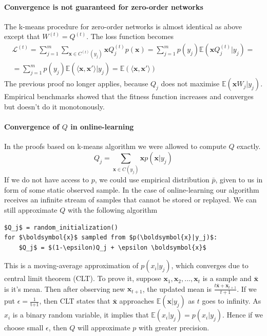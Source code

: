 \documentclass[12pt]{article}
\begin{document}
\paragraph{Convergence is not guaranteed for zero-order networks}
The k-means procedure for zero-order networks is almost identical as above except that $W^{(t)}=Q^{(t)}$. The loss function becomes
\begin{gather*}
\mathcal{L}^{(t)} = \sum_{j=1}^m \sum_{\boldsymbol{x}\in C^{(t)}(y_j)} \boldsymbol{x} Q_j^{(t)} p(\boldsymbol{x}) = \sum_{j=1}^m p(y_j) \mathbb{E}(\boldsymbol{x} Q_j^{(t)}|y_j) = \\ 
= \sum_{j=1}^m p(y_j) \mathbb{E}(\langle \boldsymbol{x},\boldsymbol{x}' \rangle |y_j) 	 = \mathbb{E}(\langle \boldsymbol{x},\boldsymbol{x}' \rangle)
\end{gather*}
The previous proof no longer applies, because $Q_j$ does not maximise $\mathbb{E}(\boldsymbol{x}W_j|y_j)$. Empirical benchmarks showed that the fitness function increases and converges but doesn't do it monotonously. 
\paragraph{Convergence of $Q$ in online-learning}
In the proofs based on k-means algorithm we were allowed to compute $Q$ exactly. 
\[
Q_j = \sum_{\boldsymbol{x}\in C(y_j)}\boldsymbol{x}p(\boldsymbol{x}|y_j)
\]
If we do not have access to $p$, we could use empirical distribution $\bar{p}$, given to us in form of some static observed sample. In the case of online-learning our algorithm receives an infinite stream of samples that cannot be stored or replayed. We can still approximate $Q$ with the following algorithm
\begin{lstlisting}
$Q_j$ = random_initialization()
for $\boldsymbol{x}$ sampled from $p(\boldsymbol{x}|y_j)$:
    $Q_j$ = $(1-\epsilon)Q_j + \epsilon \boldsymbol{x}$ 
\end{lstlisting}
This is a moving-average approximation of $p(x_i|y_j)$, which converges due to central limit theorem (CLT). To prove it, suppose $\boldsymbol{x}_1,\boldsymbol{x}_2,...,\boldsymbol{x}_t$ is a sample and $\bar{\boldsymbol{x}}$ is it's mean. Then after observing new $\boldsymbol{x}_{t+1}$, the updated mean is $\frac{t\bar{\boldsymbol{x}} + \boldsymbol{x}_{t+1} }{t+1}$. If we put $\epsilon=\frac{1}{\text{t+1}}$, then CLT states that $\bar{\boldsymbol{x}}$ approaches $\mathbb{E}(\boldsymbol{x}|y_j)$ as $t$ goes to infinity. As $x_i$ is a binary random variable, it implies that $\mathbb{E}(x_i|y_j)=p(x_i|y_j)$. Hence if we choose small $\epsilon$, then $Q$ will approximate $p$ with greater precision.
\end{document}
